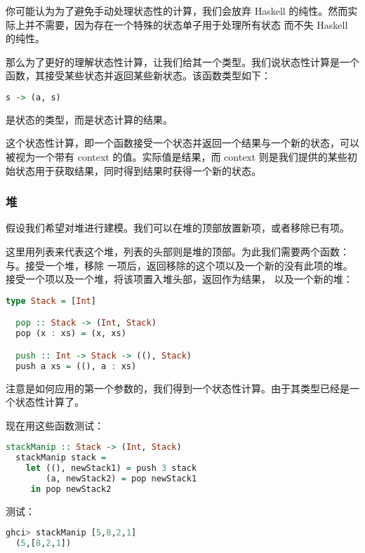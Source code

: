 \documentclass[./main.tex]{subfiles}
\begin{document}
你可能认为为了避免手动处理状态性的计算，我们会放弃 Haskell 的纯性。然而实际上并不需要，因为存在一个特殊的状态单子用于处理所有状态
而不失 Haskell 的纯性。

那么为了更好的理解状态性计算，让我们给其一个类型。我们说状态性计算是一个函数，其接受某些状态并返回某些新状态。该函数类型如下：

\begin{lstlisting}[language=Haskell]
  s -> (a, s)
\end{lstlisting}

是状态的类型，而是状态计算的结果。

这个状态性计算，即一个函数接受一个状态并返回一个结果与一个新的状态，可以被视为一个带有 context 的值。实际值是结果，而 context
则是我们提供的某些初始状态用于获取结果，同时得到结果时获得一个新的状态。

\subsubsection*{堆}

假设我们希望对堆进行建模。我们可以在堆的顶部放置新项，或者移除已有项。

这里用列表来代表这个堆，列表的头部则是堆的顶部。为此我们需要两个函数：与。接受一个堆，移除
一项后，返回移除的这个项以及一个新的没有此项的堆。接受一个项以及一个堆，将该项置入堆头部，返回\acode{()}作为结果，
以及一个新的堆：

\begin{lstlisting}[language=Haskell]
  type Stack = [Int]

  pop :: Stack -> (Int, Stack)
  pop (x : xs) = (x, xs)

  push :: Int -> Stack -> ((), Stack)
  push a xs = ((), a : xs)
\end{lstlisting}

注意是如何应用的第一个参数的，我们得到一个状态性计算。由于其类型已经是一个状态性计算了。

现在用这些函数测试：

\begin{lstlisting}[language=Haskell]
  stackManip :: Stack -> (Int, Stack)
  stackManip stack =
    let ((), newStack1) = push 3 stack
        (a, newStack2) = pop newStack1
     in pop newStack2
\end{lstlisting}

测试：

\begin{lstlisting}[language=Haskell]
  ghci> stackManip [5,8,2,1]
  (5,[8,2,1])
\end{lstlisting}
\end{document}
